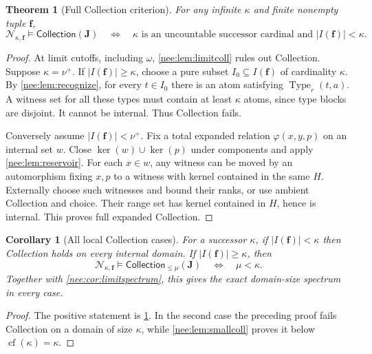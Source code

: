 \documentclass[11pt,letterpaper]{article}
\numberwithin{equation}{section}
\theoremstyle{plain}
\newtheorem{theorem}{Theorem}[section]
\newtheorem{corollary}[corollary]{Corollary}
\theoremstyle{definition}
\theoremstyle{remark}
\newcommand{\Coll}{\mathsf{Collection}}
\newcommand{\cf}{\operatorname{cf}}
\newcommand{\kerat}{\operatorname{ker}}
\begin{document}
\begin{theorem}[Full Collection criterion]\label{nee:thm:collection}
For any infinite $\kappa$ and finite nonempty tuple $\boldsymbol f$,
\begin{equation}\label{nee:eq:collcriterion}
\mathcal N_{\kappa,\boldsymbol f}\models\Coll(\boldsymbol J)
\quad\Longleftrightarrow\quad
\kappa\text{ is an uncountable successor cardinal and }
|I(\boldsymbol f)|<\kappa.
\end{equation}
\end{theorem}
\begin{proof}
At limit cutoffs, including $\omega$, \cref{nee:lem:limitcoll} rules out Collection. Suppose $\kappa=\nu^+$. If $|I(\boldsymbol f)|\geq\kappa$, choose a pure subset $I_0\subseteq I(\boldsymbol f)$ of cardinality $\kappa$. By \cref{nee:lem:recognize}, for every $t\in I_0$ there is an atom satisfying $\operatorname{Type}_r(t,a)$. A witness set for all these types must contain at least $\kappa$ atoms, since type blocks are disjoint. It cannot be internal. Thus Collection fails.

Conversely assume $|I(\boldsymbol f)|<\nu^+$. Fix a total expanded relation $\varphi(x,y,p)$ on an internal set $w$. Close $\kerat(w)\cup\kerat(p)$ under components and apply \cref{nee:lem:reservoir}. For each $x\in w$, any witness can be moved by an automorphism fixing $x,p$ to a witness with kernel contained in the same $H$. Externally choose such witnesses and bound their ranks, or use ambient Collection and choice. Their range set has kernel contained in $H$, hence is internal. This proves full expanded Collection.
\end{proof}

\begin{corollary}[All local Collection cases]\label{nee:cor:alllocal}
For a successor $\kappa$, if $|I(\boldsymbol f)|<\kappa$ then Collection holds on every internal domain. If $|I(\boldsymbol f)|\geq\kappa$, then
\[
\mathcal N_{\kappa,\boldsymbol f}\models\Coll_{\leq\mu}(\boldsymbol J)
\quad\Longleftrightarrow\quad \mu<\kappa.
\]
Together with \cref{nee:cor:limitspectrum}, this gives the exact domain-size spectrum in every case.
\end{corollary}
\begin{proof}
The positive statement is \cref{nee:thm:collection}. In the second case the preceding proof fails Collection on a domain of size $\kappa$, while \cref{nee:lem:smallcoll} proves it below $\cf(\kappa)=\kappa$.
\end{proof}
\end{document}
